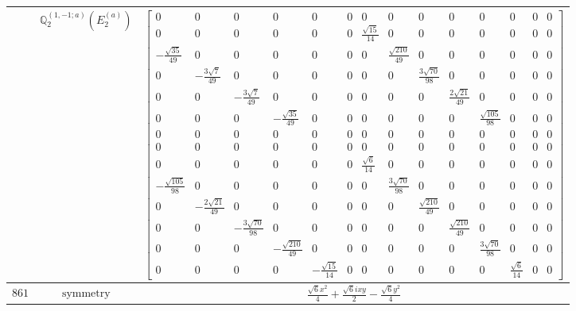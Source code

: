 \documentclass[fleqn,8pt,landscape]{jsarticle}
\begin{document}
\begin{longtable}{ccc}
$  $ & $ \mathbb{Q}_{2}^{(1,-1;a)}(E_{2}^{(a)}) $ & $ \begin{bmatrix} 0 & 0 & 0 & 0 & 0 & 0 & 0 & 0 & 0 & 0 & 0 & 0 & 0 & 0 \\ 0 & 0 & 0 & 0 & 0 & 0 & \frac{\sqrt{15}}{14} & 0 & 0 & 0 & 0 & 0 & 0 & 0 \\ - \frac{\sqrt{35}}{49} & 0 & 0 & 0 & 0 & 0 & 0 & \frac{\sqrt{210}}{49} & 0 & 0 & 0 & 0 & 0 & 0 \\ 0 & - \frac{3 \sqrt{7}}{49} & 0 & 0 & 0 & 0 & 0 & 0 & \frac{3 \sqrt{70}}{98} & 0 & 0 & 0 & 0 & 0 \\ 0 & 0 & - \frac{3 \sqrt{7}}{49} & 0 & 0 & 0 & 0 & 0 & 0 & \frac{2 \sqrt{21}}{49} & 0 & 0 & 0 & 0 \\ 0 & 0 & 0 & - \frac{\sqrt{35}}{49} & 0 & 0 & 0 & 0 & 0 & 0 & \frac{\sqrt{105}}{98} & 0 & 0 & 0 \\ 0 & 0 & 0 & 0 & 0 & 0 & 0 & 0 & 0 & 0 & 0 & 0 & 0 & 0 \\ 0 & 0 & 0 & 0 & 0 & 0 & 0 & 0 & 0 & 0 & 0 & 0 & 0 & 0 \\ 0 & 0 & 0 & 0 & 0 & 0 & \frac{\sqrt{6}}{14} & 0 & 0 & 0 & 0 & 0 & 0 & 0 \\ - \frac{\sqrt{105}}{98} & 0 & 0 & 0 & 0 & 0 & 0 & \frac{3 \sqrt{70}}{98} & 0 & 0 & 0 & 0 & 0 & 0 \\ 0 & - \frac{2 \sqrt{21}}{49} & 0 & 0 & 0 & 0 & 0 & 0 & \frac{\sqrt{210}}{49} & 0 & 0 & 0 & 0 & 0 \\ 0 & 0 & - \frac{3 \sqrt{70}}{98} & 0 & 0 & 0 & 0 & 0 & 0 & \frac{\sqrt{210}}{49} & 0 & 0 & 0 & 0 \\ 0 & 0 & 0 & - \frac{\sqrt{210}}{49} & 0 & 0 & 0 & 0 & 0 & 0 & \frac{3 \sqrt{70}}{98} & 0 & 0 & 0 \\ 0 & 0 & 0 & 0 & - \frac{\sqrt{15}}{14} & 0 & 0 & 0 & 0 & 0 & 0 & \frac{\sqrt{6}}{14} & 0 & 0 \end{bmatrix} $ \\ \hline
$ 861 $ & $ \text{symmetry} $ & $ \frac{\sqrt{6} x^{2}}{4} + \frac{\sqrt{6} i x y}{2} - \frac{\sqrt{6} y^{2}}{4} $ \\

\end{longtable}
\end{document}
